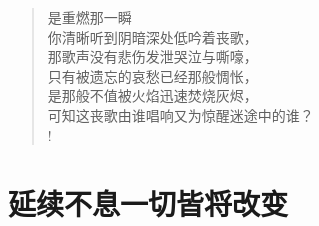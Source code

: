 \documentclass[UTF8, 12pt, a4paper]{ctexrep} %
\begin{document}
\begin{verse}
    是重燃那一瞬\\
    你清晰听到阴暗深处低吟着丧歌，\\
    那歌声没有悲伤发泄哭泣与嘶嚎，\\
    只有被遗忘的哀愁已经那般惆怅，\\
    是那般不值被火焰迅速焚烧灰烬，\\
    可知这丧歌由谁唱响又为惊醒迷途中的谁？\\!

\end{verse}
\newpage

\section*{延续不息一切皆将改变}
\newpage
\end{document}
